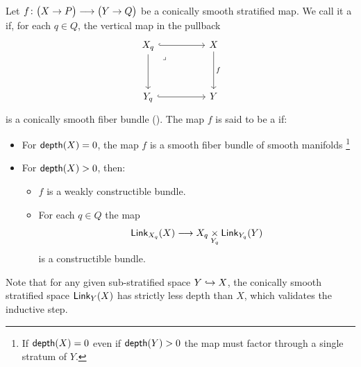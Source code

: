 \begin{definition}\label{ch4:: def: (weak) cbl}
    Let $f \colon \big(X \rightarrow P \big) \longrightarrow \big(Y \rightarrow Q \big)$ be a conically smooth stratified map. We call it a  if, for each $q\in Q$, the vertical map in the pullback
    \begin{equation}
        \begin{tikzcd}[ampersand replacement=\&]
            {X_q} \&\& X \\
            \\
            {Y_q} \&\& Y
            \arrow[hook, from=1-1, to=1-3]
            \arrow[from=1-1, to=3-1]
            \arrow["\lrcorner"{anchor=center, pos=0.125}, draw=none, from=1-1, to=3-3]
            \arrow["f", from=1-3, to=3-3]
            \arrow[hook, from=3-1, to=3-3]
        \end{tikzcd}
    \end{equation} 
    is a conically smooth fiber bundle (). The map $f$ is said to be a  if:
    \begin{itemize}
        \item For $\mathsf{depth}(X) = 0$, the map $f$ is a smooth fiber bundle of smooth manifolds \footnote{If $\mathsf{depth}(X)=0$ even if $\mathsf{depth}(Y)>0$ the map must factor through a single stratum of $Y$.}
        \item For $\mathsf{depth}(X)>0$, then:
        \begin{itemize}
            \item $f$ is a weakly constructible bundle.
            \item For each $q\in Q$ the map 
            \begin{equation}
                \operatorname{{\sf Link}}_{X_{q}}(X) \longrightarrow X_q \underset{Y_{q}}{\times} \operatorname{{\sf Link}}_{Y_{q}}(Y)
            \end{equation}
            is a constructible bundle.
        \end{itemize}
    \end{itemize}
\end{definition}

\begin{observation}
Note that for any given sub-stratified space $Y \hookrightarrow X$, the conically smooth stratified space $\operatorname{{\sf Link}}_{Y}(X)$ has strictly less depth than $X$, which validates the inductive step.
\end{observation}

